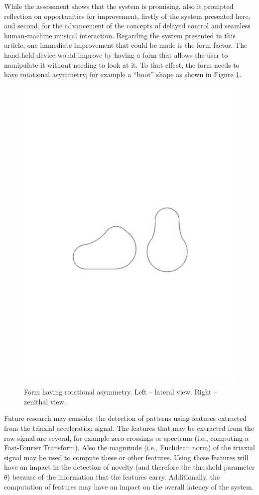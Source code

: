 \documentclass{nime-alternate_MANUSCRIPT} %
\begin{document}
While the assessment shows that the system is promising, also it prompted reflection on opportunities for improvement, firstly of the system presented here, and second, for the advancement of the concepts of delayed control and seamless human-machine musical interaction. Regarding the system presented in this article, one immediate improvement that could be made is the form factor. The hand-held device would improve by having a form that allows the user to manipulate it without needing to look at it. To that effect, the form needs to have rotational asymmetry, for example a ``boot'' shape as shown in Figure \ref{fig_8}.
	
\begin{figure}[t!]
	\centering
		\includegraphics[trim={4cm 11.2cm 4cm 12cm}, clip=true, width=0.8\columnwidth]{boot_shape}
	\caption{Form having rotational asymmetry. Left -- lateral view. Right -- zenithal view.}
	\label{fig_8}
\end{figure}	 

Future research may consider the detection of patterns using features extracted from the triaxial acceleration signal. The features that may be extracted from the raw signal are several, for example zero-crossings or spectrum (i.e., computing a Fast-Fourier Transform). Also the magnitude (i.e., Euclidean norm) of the triaxial signal may be used to compute these or other features. Using these features will have an impact in the detection of novelty (and therefore the threshold parameter $\theta $) because of the information that the features carry. Additionally, the computation of features may have an impact on the overall latency of the system. 
\end{document}
